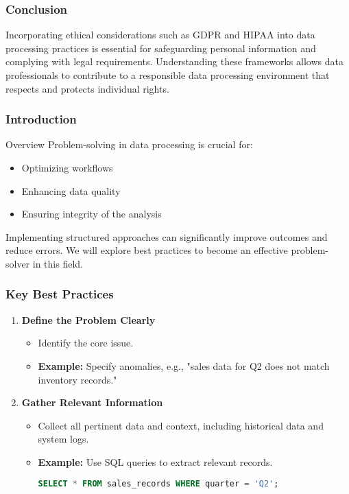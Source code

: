 \documentclass[aspectratio=169]{beamer}
\begin{document}
\begin{frame}[fragile]
    \frametitle{Conclusion}
    Incorporating ethical considerations such as GDPR and HIPAA into data processing practices is essential for safeguarding personal information and complying with legal requirements.
    Understanding these frameworks allows data professionals to contribute to a responsible data processing environment that respects and protects individual rights.
\end{frame}

\begin{frame}
    \titlepage
\end{frame}

\begin{frame}[fragile]
    \frametitle{Introduction}
    \begin{block}{Overview}
        Problem-solving in data processing is crucial for:
        \begin{itemize}
            \item Optimizing workflows
            \item Enhancing data quality
            \item Ensuring integrity of the analysis
        \end{itemize}
        Implementing structured approaches can significantly improve outcomes and reduce errors. We will explore best practices to become an effective problem-solver in this field.
    \end{block}
\end{frame}

\begin{frame}[fragile]
    \frametitle{Key Best Practices}
    \begin{enumerate}
        \item \textbf{Define the Problem Clearly}
            \begin{itemize}
                \item Identify the core issue.
                \item \textbf{Example:} Specify anomalies, e.g., "sales data for Q2 does not match inventory records."
            \end{itemize}
        
        \item \textbf{Gather Relevant Information}
            \begin{itemize}
                \item Collect all pertinent data and context, including historical data and system logs.
                \item \textbf{Example:} Use SQL queries to extract relevant records.
                \begin{lstlisting}[language=SQL]
SELECT * FROM sales_records WHERE quarter = 'Q2';
                \end{lstlisting}
            \end{itemize}
    \end{enumerate}
\end{frame}
\end{document}
